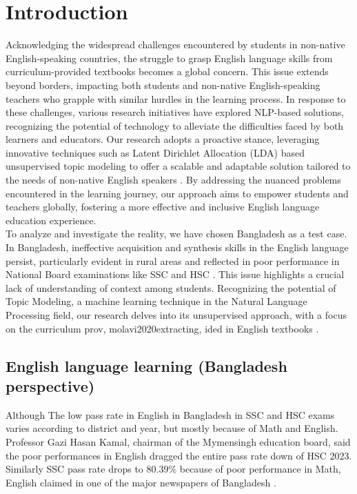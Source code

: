 \documentclass[sn-mathphys,Numbered]{sn-jnl}%
\theoremstyle{thmstyleone}%
\theoremstyle{thmstyletwo}%
\theoremstyle{thmstylethree}%
\begin{document}
\section{Introduction}\label{sec1}

Acknowledging the widespread challenges encountered by students in non-native English-speaking countries, the struggle to grasp English language skills from curriculum-provided textbooks becomes a global concern\cite{tp_Perspective}. This issue extends beyond borders, impacting both students and non-native English-speaking teachers who grapple with similar hurdles in the learning process. In response to these challenges, various research initiatives have explored NLP-based solutions, recognizing the potential of technology to alleviate the difficulties faced by both learners and educators. Our research adopts a proactive stance, leveraging innovative techniques such as Latent Dirichlet Allocation (LDA) based unsupervised topic modeling to offer a scalable and adaptable solution tailored to the needs of non-native English speakers \cite{sakhovskiy2020topic, chang2021applying}. By addressing the nuanced problems encountered in the learning journey, our approach aims to empower students and teachers globally, fostering a more effective and inclusive English language education experience.\\


To analyze and investigate the reality, we have chosen Bangladesh as a test case. In Bangladesh, ineffective acquisition and synthesis skills in the English language persist, particularly evident in rural areas and reflected in poor performance in National Board examinations like SSC and HSC \cite{noauthor_bangladesh_2021, habib_english_2018}. This issue highlights a crucial lack of understanding of context among students. Recognizing the potential of Topic Modeling, a machine learning technique in the Natural Language Processing field, our research delves into its unsupervised approach, with a focus on the curriculum prov, molavi2020extracting, ided in English textbooks \cite{hamzah2020discovering, molavi2020extracting, qiang2020short, bethard_topic_2009, ali_transportation_2019, slater_using_2017, guerra_when_2013}.\\

\subsection{English language learning (Bangladesh perspective)}
Although The low pass rate in English in Bangladesh in SSC and HSC exams varies according to district and year, but mostly because of Math and English. Professor Gazi Hasan Kamal, chairman of the Mymensingh education board, said the poor performances in English dragged the entire pass rate down of HSC 2023. Similarly SSC pass rate drops to 80.39\% because of poor performance in Math, English claimed in one of the major newspapers of Bangladesh \cite{daily_star_01}.\\ 
\end{document}
